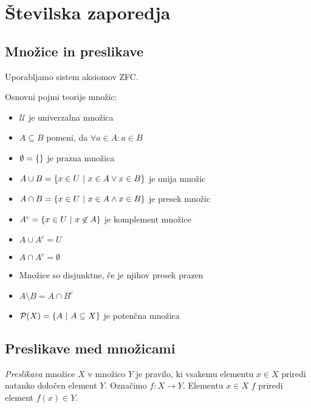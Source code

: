 \documentclass[12pt, a4paper]{article}
\begin{document}
\newpage

\section{Številska zaporedja}

\subsection{Množice in preslikave}

Uporabljamo sistem aksiomov ZFC.

\begin{definicija}
Osnovni pojmi teorije množic:

\begin{itemize}
\item $\mathcal{U}$ je univerzalna množica
\item $A\subseteq B$ pomeni, da $\forall a\in A\colon a\in B$
\item $\emptyset=\left\{\right\}$ je prazna množica
\item $A\cup B=\left\{x\in U~\middle\vert~x\in A\vee x\in B\right\}$ je unija množic
\item $A\cap B=\left\{x\in U~\middle\vert~x\in A\wedge x\in B\right\}$ je presek množic
\item $A^c=\left\{x\in U~\middle\vert~x\not\in A\right\}$ je komplement množice
\item $A\cup A^c=U$
\item $A\cap A^c=\emptyset$
\item Množice so disjunktne, če je njihov presek prazen
\item $A\setminus B=A\cap B^c$
\item $\mathcal{P}(X)=\left\{A~\middle\vert~A\subseteq X\right\}$ je potenčna množica
\end{itemize}
\end{definicija}

\subsection{Preslikave med množicami}

\begin{okvir}
\begin{definicija}
\emph{Preslikava} množice $X$ v množico $Y$ je pravilo, ki vsakemu elementu $x\in X$ priredi natanko določen element $Y$. Označimo $f\colon X\to Y$. Elementu $x\in X$ $f$ priredi element $f(x)\in Y$.
\end{definicija}
\end{okvir}
\end{document}
